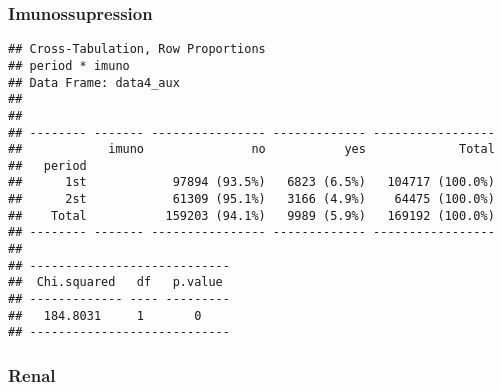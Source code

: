 \documentclass[
]{article}
\newenvironment{Shaded}{\begin{snugshade}}{\end{snugshade}}
\newcommand{\DataTypeTok}[1]{\textcolor[rgb]{0.13,0.29,0.53}{#1}}
\newcommand{\KeywordTok}[1]{\textcolor[rgb]{0.13,0.29,0.53}{\textbf{#1}}}
\newcommand{\NormalTok}[1]{#1}
\newcommand{\OperatorTok}[1]{\textcolor[rgb]{0.81,0.36,0.00}{\textbf{#1}}}
\newcommand{\OtherTok}[1]{\textcolor[rgb]{0.56,0.35,0.01}{#1}}
\newcommand{\StringTok}[1]{\textcolor[rgb]{0.31,0.60,0.02}{#1}}
\begin{document}
\hypertarget{imunossupression}{%
\subsubsection{Imunossupression}\label{imunossupression}}

\begin{Shaded}
\end{Shaded}

\begin{verbatim}
## Cross-Tabulation, Row Proportions  
## period * imuno  
## Data Frame: data4_aux  
## 
## 
## -------- ------- ---------------- ------------- -----------------
##            imuno               no           yes             Total
##   period                                                         
##      1st            97894 (93.5%)   6823 (6.5%)   104717 (100.0%)
##      2st            61309 (95.1%)   3166 (4.9%)    64475 (100.0%)
##    Total           159203 (94.1%)   9989 (5.9%)   169192 (100.0%)
## -------- ------- ---------------- ------------- -----------------
## 
## ----------------------------
##  Chi.squared   df   p.value 
## ------------- ---- ---------
##   184.8031     1       0    
## ----------------------------
\end{verbatim}

\hypertarget{renal}{%
\subsubsection{Renal}\label{renal}}

\begin{Shaded}
\end{Shaded}
\end{document}
